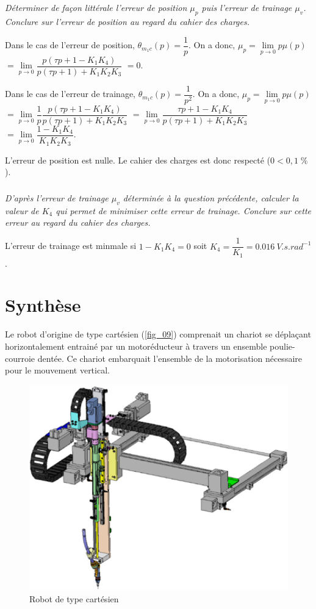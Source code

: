 \documentclass[10pt,fleqn]{article} %
\begin{document}
\subparagraph{\label{q}}\textit{Déterminer de façon littérale l’erreur de position $\mu_p$ puis l’erreur de trainage $\mu_v$. Conclure sur l’erreur de position au regard du cahier des charges.}
\ifprof
\begin{corrige}
Dans le cas de l'erreur de position, $\theta_{m_1c}(p)=\dfrac{1}{p}$. On a donc, 
$\mu_p = \lim\limits_{p\to 0}p \mu(p)$
 $ = \lim\limits_{p\to 0} \dfrac{p\left(\tau p + 1 - K_1K_4 \right)}{p\left(\tau p + 1 \right)+K_1K_2K_3}$
  $ = 0$.
  
  Dans le cas de l'erreur de trainage, $\theta_{m_1c}(p)=\dfrac{1}{p^2}$. On a donc, 
$\mu_p = \lim\limits_{p\to 0}p \mu(p)$
 $ = \lim\limits_{p\to 0} \dfrac{1}{p}\dfrac{p\left(\tau p + 1 - K_1K_4 \right)}{p\left(\tau p + 1 \right)+K_1K_2K_3}$
 $ = \lim\limits_{p\to 0} \dfrac{\tau p + 1 - K_1K_4}{p\left(\tau p + 1 \right)+K_1K_2K_3}$
  $ = \lim\limits_{p\to 0} \dfrac{ 1 - K_1K_4}{K_1K_2K_3}$.
  
  L'erreur de position est nulle. Le cahier des charges est donc respecté ($0<0,1\;\%$).
\end{corrige}
\else
\fi

\subparagraph{\label{q}}\textit{D’après l’erreur de trainage $\mu_v$ déterminée à la question précédente, calculer la valeur de $K_4$ qui permet de minimiser cette erreur de trainage. Conclure sur cette erreur au regard du cahier des charges.}
\ifprof
\begin{corrige}
L'erreur de trainage est minmale si $1 - K_1K_4=0$ soit $K_4 = \dfrac{1}{K_1} =\SI{0,016}{V.s.rad^{-1}}$.
\end{corrige}
\else
\fi

\section{Synthèse}
\ifprof
\else

Le robot d’origine de type cartésien (\autoref{fig_09}) comprenait un chariot se déplaçant horizontalement entrainé
par un motoréducteur à travers un ensemble poulie-courroie dentée. Ce chariot embarquait l’ensemble de la
motorisation nécessaire pour le mouvement vertical.


\begin{figure}[H]
\centering
\includegraphics[width=0.5\linewidth]{fig_09}
\caption{Robot de type cartésien \label{fig_09}}
\end{figure}
\end{document}

